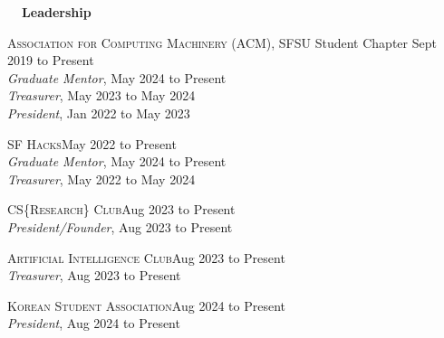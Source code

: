 \documentclass[hidelinks, 10pt]{article}
\begin{document}
{%

\pagebreak
{\fontsize{14}{14}\selectfont \textbf{\ \ Leadership\ \ }}\hrulefill

\vspace{4mm}

\begin{minipage}[ct]{0.9\linewidth}
    \textsc{Association for Computing Machinery} (ACM), SFSU Student Chapter\hfill
    Sept 2019 to Present\\
    \emph{Graduate Mentor}, May 2024 to Present\\
    \emph{Treasurer}, May 2023 to May 2024\\
    \emph{President}, Jan 2022 to May 2023
\end{minipage}

\vspace{3mm}

\begin{minipage}[ct]{0.9\linewidth}
    \textsc{SF Hacks}\hfill May 2022 to Present\\
    \emph{Graduate Mentor}, May 2024 to Present\\
    \emph{Treasurer}, May 2022 to May 2024
\end{minipage}

\vspace{3mm}

\begin{minipage}[ct]{0.9\linewidth}
    \textsc{CS}\{\textsc{Research}\}\textsc{ Club}\hfill Aug 2023 to Present\\
    \emph{President/Founder}, Aug 2023 to Present
\end{minipage}

\vspace{3mm}

\begin{minipage}[ct]{0.9\linewidth}
    \textsc{Artificial Intelligence Club}\hfill Aug 2023 to Present\\
    \emph{Treasurer}, Aug 2023 to Present
\end{minipage}

\vspace{3mm}

\begin{minipage}[ct]{0.9\linewidth}
    \textsc{Korean Student Association}\hfill Aug 2024 to Present\\
    \emph{President}, Aug 2024 to Present
\end{minipage}

}
\end{document}
